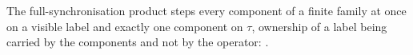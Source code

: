 \begin{definition}
  \label{def:syncproduct}
  \leanok
  The full-synchronisation product steps every component of a finite family at once on a visible label and exactly one component on $\tau$, ownership of a label being carried by the components and not by the operator: .
\end{definition}
